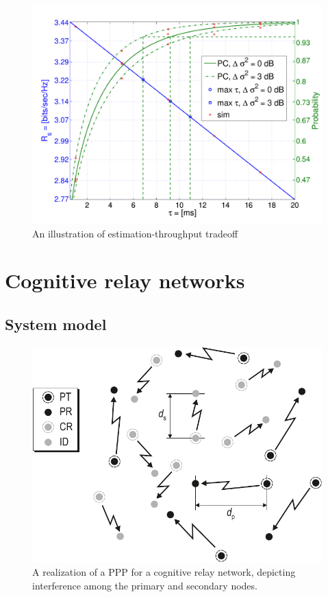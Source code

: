 \begin{figure}[!t]
	\centering
        \includegraphics[width=0.8\columnwidth]{../kapitel04/figures/fig_thr_est_time_tradeoff_AWGN}
	\caption{An illustration of estimation-throughput tradeoff}
	\label{fig:ID_OC}
\end{figure}



\section{Cognitive relay networks}
\subsection{System model}

\begin{figure}[!t]
        \centering
        \includegraphics[trim=0.0cm 0.0cm 0.0cm 0.0cm,clip=true,width=0.8\columnwidth]{../kapitel04/figures/SGeometry}
        \caption{A realization of a PPP for a cognitive relay network, depicting interference among the primary and secondary nodes.} 
        \label{fig:Int_Sc}
\end{figure}
\cite{Kaushik_PIMRC}


